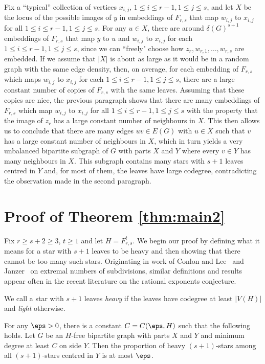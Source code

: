 Fix a ``typical'' collection of vertices $x_{i,j}$, $1\leq i\leq r-1,1\leq j\leq s$, and let $X$ be the locus of the possible images of $y$ in embeddings of $F_{r,s}$ that map $w_{i,j}$ to $x_{i,j}$ for all $1\leq i\leq r-1,1\leq j\leq s$. For any $u\in X$, there are around $\delta(G)^{s+1}$ embeddings of $F_{r,s}$ that map $y$ to $u$ and $w_{i,j}$ to $x_{i,j}$ for each $1\leq i\leq r-1,1\leq j\leq s$, since we can ``freely" choose how $z_r,w_{r,1},\dots,w_{r,s}$ are embedded. If we assume that $|X|$ is about as large as it would be in a random graph with the same edge density, then, on average, for each embedding of $F_{r,s}$ which maps $w_{i,j}$ to $x_{i,j}$ for each $1\leq i\leq r-1,1\leq j\leq s$, there are a large constant number of copies of $F_{r,s}$ with the same leaves. Assuming that these copies are nice, the previous paragraph shows that there are many embeddings of $F_{r,s}$ which map $w_{i,j}$ to $x_{i,j}$ for all $1\leq i\leq r-1,1\leq j\leq s$ with the property that the image of $z_r$ has a large constant number of neighbours in $X$. This then allows us to conclude that there are many edges $uv\in E(G)$ with $u\in X$ such that $v$ has a large constant number of neighbours in $X$, which in turn yields a very unbalanced bipartite subgraph of $G$ with parts $X$ and $Y$ where every $v\in Y$ has many neighbours in $X$. This subgraph contains many stars with $s+1$ leaves centred in $Y$ and, for most of them, the leaves have large codegree, contradicting the observation made in the second paragraph.


\section{Proof of Theorem \ref{thm:main2}}

Fix $r\geq s+2\geq 3$, $t\geq 1$ and let $H=F_{r,s}^t$. We begin  our proof by defining what it means for a star with $s+1$ leaves to be heavy and then showing that there cannot be too many such stars. Originating in work of Conlon and Lee~\cite{CL21} and Janzer~\cite{Jan19} on extremal numbers of subdivisions, similar definitions and results appear often in the recent literature on the rational exponents conjecture.

\begin{definition}
	We call a star with $s+1$ leaves \emph{heavy} if the leaves have codegree at least $|V(H)|$ and \emph{light} otherwise.
\end{definition}

\begin{lemma} \label{lem:heavy stars}
	For any $\eps>0$, there is a constant $C=C(\eps,H)$ such that the following holds. Let $G$ be an $H$-free bipartite graph with parts $X$ and $Y$ and minimum degree at least $C$ on side $Y$. Then the proportion of heavy $(s+1)$-stars among all $(s+1)$-stars centred in $Y$ is at most $\eps$.
\end{lemma}

